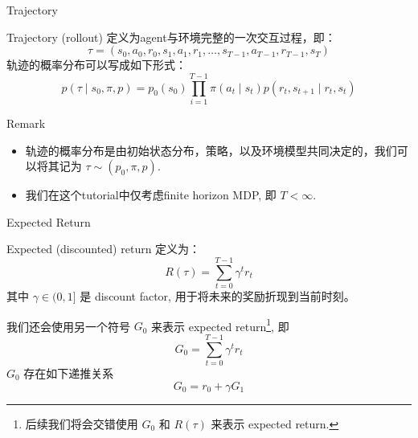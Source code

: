\documentclass[aspectratio=169]{beamer}
\begin{document}
\begin{frame}{Trajectory}
    \begin{definition}[Trajectory]
        Trajectory (rollout) 定义为agent与环境完整的一次交互过程，即：
        \begin{equation}
            \tau=(s_0, a_0, r_0, s_1, a_1, r_1, \ldots, s_{T-1}, a_{T-1}, r_{T-1}, s_T)
        \end{equation}
        轨迹的概率分布可以写成如下形式：
        \begin{equation}
            p(\tau\mid s_0, \pi, p) =  p_0(s_0)\prod_{i=1}^{T-1}\pi(a_t\mid s_t)p(r_t, s_{t+1}\mid r_t,s_t)
        \end{equation}
    \end{definition}

    \begin{block}{Remark}
        \begin{itemize}
            \item 轨迹的概率分布是由初始状态分布，策略，以及环境模型共同决定的，我们可以将其记为 $\tau\sim(p_0,\pi, p)$.
            \item 我们在这个tutorial中仅考虑finite horizon MDP, 即 $T<\infty$.
        \end{itemize}
    \end{block}
\end{frame}

\begin{frame}{Expected Return}
    \begin{definition}
        Expected (discounted) return 定义为：
        \begin{equation}
            R(\tau) = \sum_{t=0}^{T-1} \gamma^t r_t
        \end{equation}
        其中 $\gamma\in(0,1]$ 是 discount factor, 用于将未来的奖励折现到当前时刻。
        
        我们还会使用另一个符号 $G_0$ 来表示 expected return\footnote{后续我们将会交错使用 $G_0$ 和 $R(\tau)$ 来表示 expected return.}, 即 
        \begin{equation}
            G_0 = \sum_{t=0}^{T-1} \gamma^t r_t
        \end{equation}
        $G_0$ 存在如下递推关系
        \begin{equation}
            G_0 = r_0 + \gamma G_1
        \end{equation}
    \end{definition}
    
\end{frame}
\end{document}
